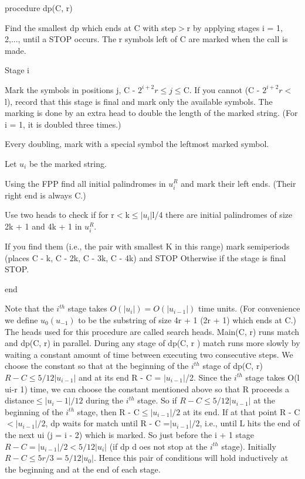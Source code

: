 \documentclass[11pt,a4paper]{report}
\begin{document}
procedure dp(C, r)
\begin{myindentpar}{2em}
Find the smallest dp which ends at C with step$>$r by
applying stages i = 1, 2,..., until a STOP occurs. The r symbols
left of C are marked when the call is made.

Stage i

Mark the symbols in positions j, C - $2^{i+2}r\leq j \leq $C. If you cannot
(C - $2^{i+2}r<$l), record that this stage is final and mark only the
available symbols. The marking is done by an extra head to double
the length of the marked string. (For i = 1, it is doubled three times.)

Every doubling, mark with a special symbol the leftmost marked
symbol.

Let $u_i$ be the marked string.

Using the FPP find all initial palindromes in $u_i^R$ and mark their
left ends. (Their right end is always C.)

Use two heads to check if for r$<$k$\leq |u_i| $l/4 there are initial
palindromes of size 2k + 1 and 4k + 1 in $u_i^R$.

If you find them (i.e., the pair with smallest K in this range)
mark semiperiods (places C - k, C - 2k, C - 3k, C - 4k) and STOP
Otherwise if the stage is final STOP.

\end{myindentpar}

end

Note that the $i^{th}$ stage takes $O(| u_i |) = O(| u_{i-1} |)$ time units. (For convenience we
define $u_0 (u_{-1})$ to be the substring of size 4r + 1 (2r + 1) which ends at C.) The heads 
used for this procedure are called search heads. Main(C, r) runs match and dp(C, r) in
parallel. During any stage of dp(C, r ) match runs more slowly by waiting a constant
amount of time between executing two consecutive steps. We choose the constant so that
at the beginning of the $i^{th}$ stage of dp(C, r) $R - C\leq 5/12 | u_{i-1} |$ and at its end R - C =
$ |u_{i-1}| $/2. Since the $i^{th}$ stage takes O(l ui-r 1) time, we can choose the constant mentioned
above so that R proceeds a distance$\leq |u_i - 1 |/12$ during the $i^{th}$ stage. So if
$ R - C \leq 5/12 | u_{i-1} |$ at the beginning of the $i^{th}$ stage, then R - C$\leq | u_{i-1} |/2$ at its end. If at that
point R - C$< |u_{i-1}|/2$, dp waits for match until R - C =$|  u_{i-1}| /2$, i.e., until L hits
the end of the next ui (j = i - 2) which is marked. So just before the i + 1 stage
$R - C = | u_{i-1}|/2<5/12|u_i|$ (if dp d oes not stop at the $i^{th}$ stage). Initially $R - C \leq
5r/3 = 5/12 | u_0 |$. Hence this pair of conditions will hold inductively at the beginning and
at the end of each stage.
\end{document}
